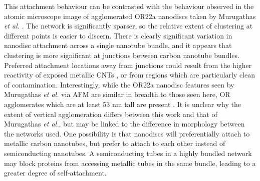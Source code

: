 \documentclass[
  a4paper,
]{scrbook}
\begin{document}
This attachment behaviour can be contrasted with the behaviour observed
in the atomic microscope image of agglomerated OR22a nanodiscs taken by
Murugathas \emph{et al.} \autocite{Murugathas2019a}. The network is
significantly sparser, so the relative extent of clustering at different
points is easier to discern. There is clearly significant variation in
nanodisc attachment across a single nanotube bundle, and it appears that
clustering is more significant at junctions between carbon nanotube
bundles. Preferred attachment locations away from junctions could result
from the higher reactivity of exposed metallic CNTs \autocite{Cao2009},
or from regions which are particularly clean of contamination.
Interestingly, while the OR22a nanodisc features seen by Murugathas
\emph{et al.} via AFM are similar in breadth to those seen here, OR
agglomerates which are at least 53 nm tall are present
\autocite{Murugathas2020}. It is unclear why the extent of vertical
agglomeration differs between this work and that of Murugathas \emph{et
al.}, but may be linked to the difference in morphology between the
networks used. One possibility is that nanodiscs will preferentially
attach to metallic carbon nanotubes, but prefer to attach to each other
instead of semiconducting nanotubes. A semiconducting tubes in a highly
bundled network may block proteins from accessing metallic tubes in the
same bundle, leading to a greater degree of self-attachment.
\end{document}
